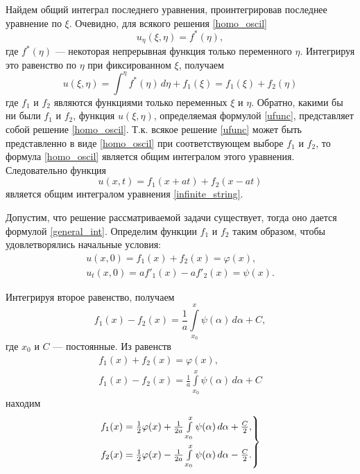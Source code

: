 Найдем общий интеграл последнего уравнения, проинтегрировав последнее уравнение по $\xi$. Очевидно, для всякого решения \eqref{homo_oscil}
\begin{equation*}
	u_{\eta}(\xi, \eta) = f^{\ast}(\eta),
\end{equation*}
где $f^{\ast}(\eta)$ --- некоторая непрерывная функция только переменного $\eta$. 
Интегрируя это равенство по $\eta$ при фиксированном $\xi$, получаем
\begin{equation} \label{ufunc}
	u(\xi, \eta) = \int^{\eta} f^{\ast}(\eta) \, d \eta + f_1(\xi) = f_1(\xi) + f_2(\eta)
\end{equation}
где $f_1$ и $f_2$ являются функциями только переменных $\xi$ и $\eta$. Обратно, какими бы ни были $f_1$ и $f_2$, функция $u(\xi, \eta)$, определяемая формулой \eqref{ufunc}, представляет собой решение \eqref{homo_oscil}. Т.к. всякое решение \eqref{ufunc} может быть представленно в виде \eqref{homo_oscil} при соответствующем выборе $f_1$ и $f_2$, то формула \eqref{homo_oscil} является общим интегралом этого уравнения. Следовательно функция
\begin{equation} \label{general_int}
	u(x, t) = f_1(x + a t) + f_2(x - a t)
\end{equation}
является общим интегралом уравнения \eqref{infinite_string}.

Допустим, что решение рассматриваемой задачи существует, тогда оно дается формулой \eqref{general_int}. Определим функции $f_1$ и $f_2$ таким образом, чтобы удовлетворялись начальные условия:
\begin{align}
	u(x, 0) = f_1(x) + f_2(x) = \varphi(x), \\
	u_t(x, 0) = a f'_1(x) - a f'_2(x) = \psi(x).
\end{align}

Интегрируя второе равенство, получаем 
\begin{equation*}
	f_1(x) - f_2(x) = \frac{1}{a} \int \limits_{x_0}^{x} \psi(\alpha) \, d\alpha + C,
\end{equation*}
где $x_0$ и $C$ --- постоянные. Из равенств 
\begin{align*}
	f_1(x) + f_2(x) = \varphi(x), \\
	f_1(x) - f_2(x) = \frac{1}{a} \int \limits_{x_0}^{x} \psi(\alpha) \, d\alpha + C
\end{align*}
находим
\begin{equation} \label{f1f2}
	\begin{rcases}
		f_1(x) = \frac{1}{2} \varphi(x) + \frac{1}{2a} \int \limits_{x_0}^{x} \psi(\alpha) \, d\alpha + \frac{C}{2}, \\
		f_2(x) = \frac{1}{2} \varphi(x) - \frac{1}{2a} \int \limits_{x_0}^{x} \psi(\alpha) \, d\alpha - \frac{C}{2}.
	\end{rcases}
\end{equation}

